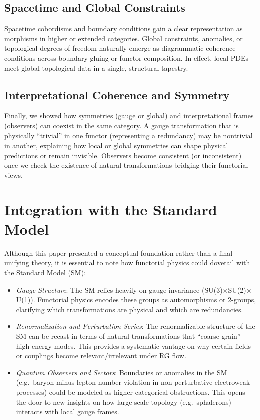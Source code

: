 \documentclass[12pt]{article}
\begin{document}
\subsection{Spacetime and Global Constraints}
Spacetime cobordisms and boundary conditions gain a clear representation as morphisms in higher or extended categories. Global constraints, anomalies, or topological degrees of freedom naturally emerge as diagrammatic coherence conditions across boundary gluing or functor composition. In effect, local PDEs meet global topological data in a single, structural tapestry.

\subsection{Interpretational Coherence and Symmetry}
Finally, we showed how symmetries (gauge or global) and interpretational frames (observers) can coexist in the same category. A gauge transformation that is physically ``trivial'' in one functor (representing a redundancy) may be nontrivial in another, explaining how local or global symmetries can shape physical predictions or remain invisible. Observers become consistent (or inconsistent) once we check the existence of natural transformations bridging their functorial views.

\section{Integration with the Standard Model}
Although this paper presented a conceptual foundation rather than a final unifying theory, it is essential to note how functorial physics could dovetail with the Standard Model (SM):
\begin{itemize}[label=$\bullet$]
\item \emph{Gauge Structure}: The SM relies heavily on gauge invariance (SU(3)$\times$SU(2)$\times$U(1)). Functorial physics encodes these groups as automorphisms or 2-groups, clarifying which transformations are physical and which are redundancies.
\item \emph{Renormalization and Perturbation Series}: The renormalizable structure of the SM can be recast in terms of natural transformations that ``coarse-grain'' high-energy modes. This provides a systematic vantage on why certain fields or couplings become relevant/irrelevant under RG flow.
\item \emph{Quantum Observers and Sectors}: Boundaries or anomalies in the SM (e.g.\ baryon-minus-lepton number violation in non-perturbative electroweak processes) could be modeled as higher-categorical obstructions. This opens the door to new insights on how large-scale topology (e.g.\ sphalerons) interacts with local gauge frames.
\end{itemize}
\end{document}
